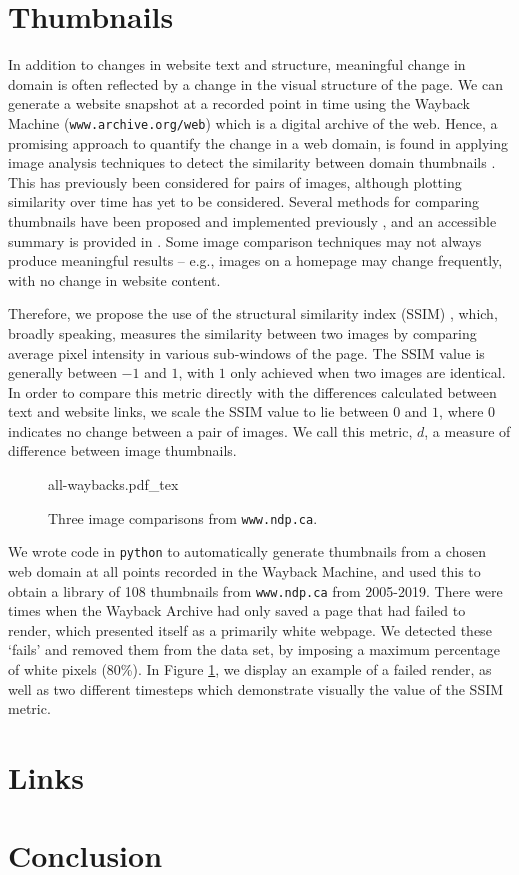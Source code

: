 \documentclass[10pt, a4paper]{article}
\begin{document}
\section{Thumbnails}
In addition to changes in website text and structure, meaningful change in domain is often reflected by a change in the visual structure of the page. We can generate a website snapshot at a recorded point in time using the Wayback Machine (\texttt{www.archive.org/web}) which is a digital archive of the web. Hence, a promising approach to quantify the change in a web domain, is found in applying image analysis techniques to detect the similarity between domain thumbnails \cite{alsum2014thumbnail}. This has previously been considered for pairs of images, although plotting similarity over time has yet to be considered. Several methods for comparing thumbnails have been proposed and implemented previously \cite{henzinger,broder,manku}, and an accessible summary is provided in \cite{alsum2014thumbnail}. Some image comparison techniques may not always produce meaningful results -- e.g., images on a homepage may change frequently, with no change in website content.

Therefore, we propose the use of the structural similarity index (SSIM) \cite{ssim}, which, broadly speaking, measures the similarity between two images by comparing average pixel intensity in various sub-windows of the page. The SSIM value is generally between $-1$ and $1$, with $1$ only achieved when two images are identical. In order to compare this metric directly with the differences calculated between text and website links, we scale the SSIM value to lie between $0$ and $1$, where $0$ indicates no change between a pair of images. We call this metric, $d$, a measure of difference between image thumbnails.

\begin{figure}[h!]
\centering
\def\svgwidth{
0.7\columnwidth}
{all-waybacks.pdf_tex}
  \caption{Three image comparisons from \texttt{www.ndp.ca}.}
\label{fig::wayback_images}
\end{figure}

We wrote code in \texttt{python} to automatically generate thumbnails from a chosen web domain at all points recorded in the Wayback Machine, and used this to obtain a library of 108 thumbnails from \texttt{www.ndp.ca} from 2005-2019. There were times when the Wayback Archive had only saved a page that had failed to render, which presented itself as a primarily white webpage. We detected these `fails' and removed them from the data set, by imposing a maximum percentage of white pixels (80\%). In Figure \ref{fig::wayback_images}, we display an example of a failed render, as well as two different timesteps which demonstrate visually the value of the SSIM metric.

\section{Links}

\section{Conclusion}

\newpage


\end{document}
